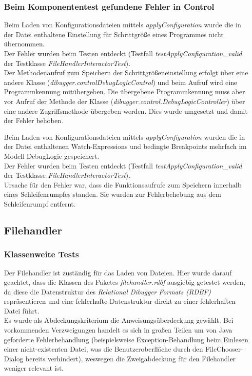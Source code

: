 \documentclass[parskip=full]{scrartcl}
\begin{document}
\subsubsection{Beim Komponententest gefundene Fehler in Control}\label{fehlerInControl}
Beim Laden von Konfigurationsdateien mittels \textit{applyConfiguration} wurde die in der Datei enthaltene Einstellung für Schrittgröße eines Programmes nicht übernommen.\\
Der Fehler wurden beim Testen entdeckt (Testfall \textit{testApplyConfiguration\_valid} der Testklasse \textit{FileHandlerInteractorTest}).\\
Der Methodenaufruf zum Speichern der Schrittgrößeneinstellung erfolgt über eine andere Klasse (\textit{dibugger.controlDebugLogicControl}) und beim Aufruf wird eine Programmkennung mitübergeben.
Die übergebene Programmkennung muss aber vor Aufruf der Methode der Klasse (\textit{dibugger.control.DebugLogicController}) über eine andere Zugriffsmethode übergeben werden.
Dies wurde umgesetzt und damit der Fehler behoben.

Beim Laden von Konfigurationsdateien mittels \textit{applyConfiguration} wurden die in der Datei enthaltenen Watch-Expressions und bedingte Breakpoints mehrfach im Modell DebugLogic gespeichert.\\
Der Fehler wurden beim Testen entdeckt (Testfall \textit{testApplyConfiguration\_valid} der Testklasse \textit{FileHandlerInteractorTest}).\\
Ursache für den Fehler war, dass die Funktionsaufrufe zum Speichern innerhalb eines Schleifenrumpfes standen. 
Sie wurden zur Fehlerbehebung aus dem Schleifenrumpf entfernt.

\subsection{Filehandler}
\subsubsection{Klassenweite Tests}
Der Filehandler ist zuständig für das Laden von Dateien. Hier wurde darauf geachtet, dass die Klassen des Paketes \textit{filehandler.rdbf} ausgiebig getestet werden, da diese die Datenstruktur des \textit{Relational Dibugger Formats (RDBF)} repräsentieren und eine fehlerhafte Datenstruktur direkt zu einer fehlerhaften Datei führt.\\
Es wurde als Abdeckungskriterium die Anweisungsüberdeckung gewählt. Bei vorkommenden Verzweigungen handelt es sich in großen Teilen um von Java geforderte Fehlerbehandlung (beispielsweise Exception-Behandlung beim Einlesen einer nicht-existenten Datei, was die Benutzeroberfläche durch den FileChooser-Dialog bereits verhindert), weswegen die Zweigabdeckung für den Filehandler weniger relevant ist.
\end{document}
